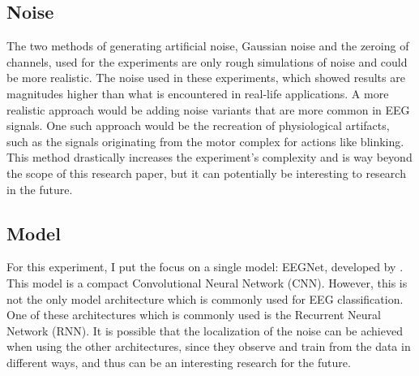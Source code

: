 \subsection{Noise}

The two methods of generating artificial noise, Gaussian noise and the zeroing of channels, used for the experiments are only rough simulations of noise and could be more realistic. The noise used in these experiments, which showed results are magnitudes higher than what is encountered in real-life applications. A more realistic approach would be adding noise variants that are more common in EEG signals. One such approach would be the recreation of physiological artifacts, such as the signals originating from the motor complex for actions like blinking. This method drastically increases the experiment's complexity and is way beyond the scope of this research paper, but it can potentially be interesting to research in the future.

\subsection{Model}

For this experiment, I put the focus on a single model: EEGNet, developed by \cite{lawhern2018eegnet}. This model is a compact Convolutional Neural Network (CNN). However, this is not the only model architecture which is commonly used for EEG classification. One of these architectures which is commonly used is the Recurrent Neural Network (RNN). It is possible that the localization of the noise can be achieved when using the other architectures, since they observe and train from the data in different ways, and thus can be an interesting research for the future.
